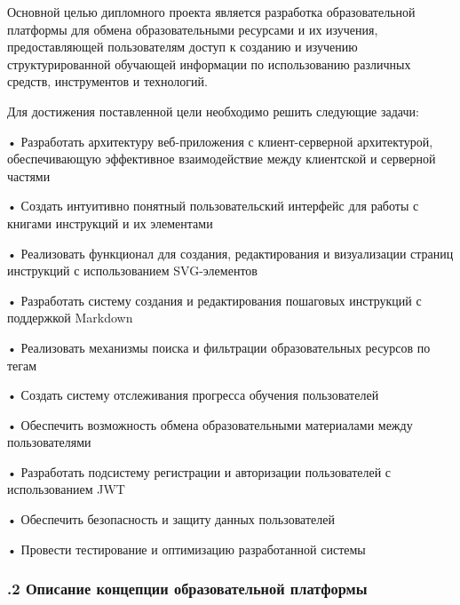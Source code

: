 {\gostFont

  \par \redline Основной целью дипломного проекта является разработка образовательной платформы для обмена образовательными ресурсами и их изучения, предоставляющей пользователям доступ к созданию и изучению структурированной обучающей информации по использованию различных средств, инструментов и технологий.

  \par \redline Для достижения поставленной цели необходимо решить следующие задачи:

  \par \redline • Разработать архитектуру веб-приложения с клиент-серверной архитектурой, обеспечивающую эффективное взаимодействие между клиентской и серверной частями
  \par \redline • Создать интуитивно понятный пользовательский интерфейс для работы с книгами инструкций и их элементами
  \par \redline • Реализовать функционал для создания, редактирования и визуализации страниц инструкций с использованием SVG-элементов
  \par \redline • Разработать систему создания и редактирования пошаговых инструкций с поддержкой Markdown
  \par \redline • Реализовать механизмы поиска и фильтрации образовательных ресурсов по тегам
  \par \redline • Создать систему отслеживания прогресса обучения пользователей
  \par \redline • Обеспечить возможность обмена образовательными материалами между пользователями
  \par \redline • Разработать подсистему регистрации и авторизации пользователей с использованием JWT
  \par \redline • Обеспечить безопасность и защиту данных пользователей
  \par \redline • Провести тестирование и оптимизацию разработанной системы

  \par
}

\subtitlespace

\subsubsection*{ 
  \gostTitleFont
  .2 Описание концепции образовательной платформы
} 

\subtitlespace

